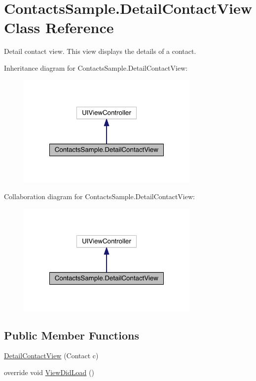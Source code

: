 \hypertarget{class_contacts_sample_1_1_detail_contact_view}{\section{Contacts\+Sample.\+Detail\+Contact\+View Class Reference}
\label{class_contacts_sample_1_1_detail_contact_view}
}


Detail contact view. This view displays the details of a contact.  




Inheritance diagram for Contacts\+Sample.\+Detail\+Contact\+View\+:
\nopagebreak
\begin{figure}[H]
\begin{center}
\leavevmode
\includegraphics[width=252pt]{class_contacts_sample_1_1_detail_contact_view__inherit__graph}
\end{center}
\end{figure}


Collaboration diagram for Contacts\+Sample.\+Detail\+Contact\+View\+:
\nopagebreak
\begin{figure}[H]
\begin{center}
\leavevmode
\includegraphics[width=252pt]{class_contacts_sample_1_1_detail_contact_view__coll__graph}
\end{center}
\end{figure}
\subsection*{Public Member Functions}
\begin{DoxyCompactItemize}
\item 
\hyperlink{class_contacts_sample_1_1_detail_contact_view_a24621f0d7863009ef48fcbf2b0e5b3fe}{Detail\+Contact\+View} (Contact c)
\item 
override void \hyperlink{class_contacts_sample_1_1_detail_contact_view_ad8cb4d2071f2ccdcfa029191e0922646}{View\+Did\+Load} ()
\end{DoxyCompactItemize}


